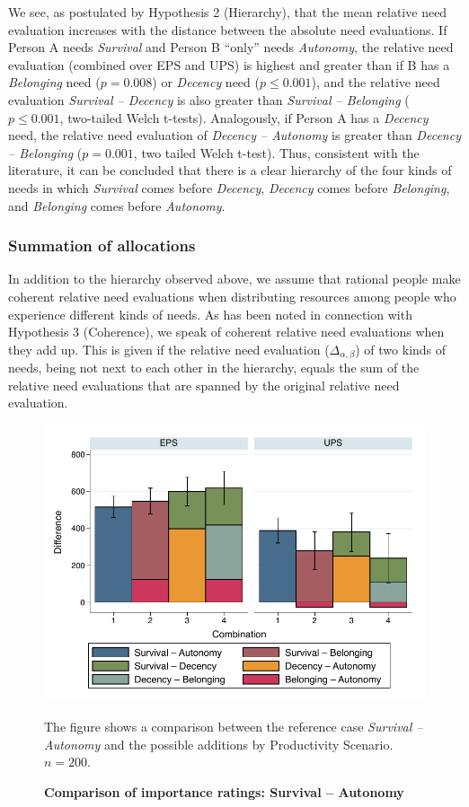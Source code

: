\documentclass[10pt,letterpaper]{article}
\begin{document}
We see, as postulated by Hypothesis 2 (Hierarchy), that the mean relative need evaluation increases with the distance between the absolute need evaluations.
If Person A needs \textit{Survival} and Person B ``only'' needs \textit{Autonomy}, the relative need evaluation (combined over EPS and UPS) is highest and greater than if B has a \textit{Belonging} need ($p=0.008$) or \textit{Decency} need ($p\leq0.001$), and the relative need evaluation \textit{Survival -- Decency} is also greater than \textit{Survival -- Belonging} ($p\leq0.001$, two-tailed Welch t-tests).
Analogously, if Person A has a \textit{Decency} need, the relative need evaluation of \textit{Decency -- Autonomy} is greater than \textit{Decency -- Belonging} ($p=0.001$, two tailed Welch t-test).
Thus, consistent with the literature, it can be concluded that there is a clear hierarchy of the four kinds of needs in which \textit{Survival} comes before \textit{Decency}, \textit{Decency} comes before \textit{Belonging}, and \textit{Belonging} comes before \textit{Autonomy}.


\subsubsection*{Summation of allocations}\label{sec:results_additivity}
In addition to the hierarchy observed above, we assume that rational people make coherent relative need evaluations when distributing resources among people who experience different kinds of needs.
As has been noted in connection with Hypothesis 3 (Coherence), we speak of coherent relative need evaluations when they add up.
This is given if the relative need evaluation ($\Delta_{\alpha,\beta}$) of two kinds of needs, being not next to each other in the hierarchy, equals the sum of the relative need evaluations that are spanned by the original relative need evaluation.

\begin{figure}[t]
   \includegraphics[width=\textwidth]{figures/figure_6.pdf}
   \caption{\bf Comparison of importance ratings: Survival -- Autonomy}
   The figure shows a comparison between the reference case \textit{Survival -- Autonomy} and the possible additions by Productivity Scenario. $n=200$.
   \label{fig:additivity_all}
\end{figure}
\end{document}

